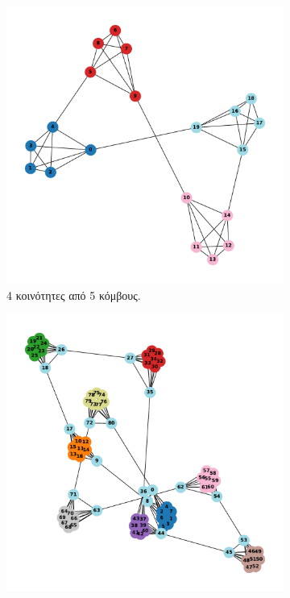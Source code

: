 \documentclass[12pt, letterpaper]{article}
\begin{document}
\begin{figure}[h]
  \centering
  \begin{subfigure}{0.3\textwidth}
      \includegraphics[width=\textwidth]{cluster_4,5newman_auto.pdf}
      \caption{4 κοινότητες από 5 κόμβους.}
      \label{9a}
  \end{subfigure}
  \begin{subfigure}{0.3\textwidth}
      \includegraphics[width=\textwidth]{cluster_9,9newman_auto.pdf}

\end{subfigure}
\end{figure}
\end{document}
